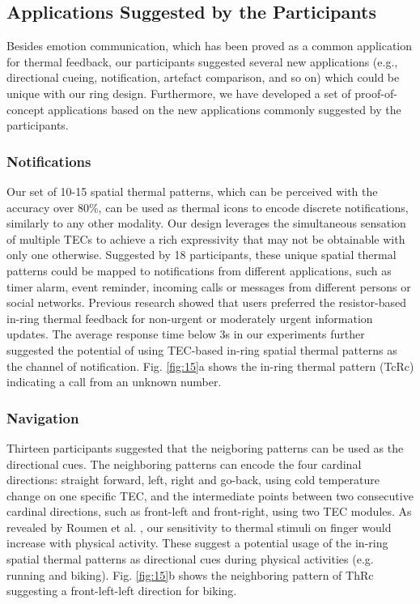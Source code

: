 \documentclass[preprint,12pt]{elsarticle}
\begin{document}
\subsection{Applications Suggested by the Participants}
Besides emotion communication, which has been proved as a common application for thermal feedback, our participants suggested several new applications (e.g., directional cueing, notification, artefact comparison, and so on) which could be unique with our ring design. Furthermore, we have developed a set of proof-of-concept applications based on the new applications commonly suggested by the participants.

\subsubsection{Notifications}
Our set of 10-15 spatial thermal patterns, which can be perceived with the accuracy over 80\%, can be used as thermal icons to encode discrete notifications, similarly to any other modality. Our design leverages the simultaneous sensation of multiple TECs to achieve a rich expressivity that may not be obtainable with only one otherwise. Suggested by 18 participants, these unique spatial thermal patterns could be mapped to notifications from different applications, such as timer alarm, event reminder, incoming calls or messages from different persons or social networks. Previous research \cite{24} showed that users preferred the resistor-based in-ring thermal feedback for non-urgent or moderately urgent information updates. The average response time below 3s in our experiments further suggested the potential of using TEC-based in-ring spatial thermal patterns as the channel of notification. Fig. \ref{fig:15}a shows the in-ring thermal pattern (TcRc) indicating a call from an unknown number.

\subsubsection{Navigation}
Thirteen participants suggested that the neigboring patterns can be used as the directional cues. The neighboring patterns can encode the four cardinal directions: straight forward, left, right and go-back, using cold temperature change on one specific TEC, and the intermediate points between two consecutive cardinal directions, such as front-left and front-right, using two TEC modules. As revealed by Roumen et al. \cite{24}, our sensitivity to thermal stimuli on finger would increase with physical activity. These suggest a potential usage of the in-ring spatial thermal patterns as directional cues during physical activities (e.g. running and biking). Fig. \ref{fig:15}b shows the neighboring pattern of ThRc suggesting a front-left-left direction for biking.
\end{document}
